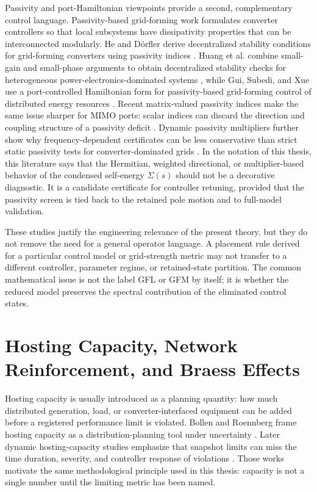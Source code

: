Passivity and port-Hamiltonian viewpoints provide a second, complementary
control language. Passivity-based grid-forming work formulates converter
controllers so that local subsystems have dissipativity properties that can be
interconnected modularly. He and D{\"o}rfler derive decentralized stability
conditions for grid-forming converters using passivity indices
\cite{he2024passivity}. Huang et al. combine small-gain and small-phase
arguments to obtain decentralized stability checks for heterogeneous
power-electronics-dominated systems \cite{huang2024gainphase}, while Gui,
Subedi, and Xue use a port-controlled Hamiltonian form for passivity-based
grid-forming control of distributed energy resources \cite{gui2024passivity}.
Recent matrix-valued passivity indices make the same issue sharper for MIMO
ports: scalar indices can discard the direction and coupling structure of a
passivity deficit \cite{ru2026matrix}. Dynamic passivity multipliers further
show why frequency-dependent certificates can be less conservative than strict
static passivity tests for converter-dominated grids \cite{gorbunov2026dynamic}.
In the notation of this thesis, this literature says that the Hermitian,
weighted directional, or multiplier-based behavior of the condensed
self-energy \(\Sigma(s)\) should not be a decorative diagnostic. It is a
candidate certificate for controller retuning, provided that the passivity
screen is tied back to the retained pole motion and to full-model validation.

These studies justify the engineering relevance of the present theory, but
they do not remove the need for a general operator language. A placement rule
derived for a particular control model or grid-strength metric may not
transfer to a different controller, parameter regime, or retained-state
partition. The common mathematical issue is not the label GFL or GFM by
itself; it is whether the reduced model preserves the spectral contribution of
the eliminated control states.

\section{Hosting Capacity, Network Reinforcement, and Braess Effects}

Hosting capacity is usually introduced as a planning quantity: how much
distributed generation, load, or converter-interfaced equipment can be added
before a registered performance limit is violated. Bollen and Roennberg frame
hosting capacity as a distribution-planning tool under uncertainty
\cite{bollen2017hosting}. Later dynamic hosting-capacity studies emphasize
that snapshot limits can miss the time duration, severity, and controller
response of violations \cite{oliveira2019dynamicHosting,jain2020dynamicHosting}.
Those works motivate the same methodological principle used in this thesis:
capacity is not a single number until the limiting metric has been named.

